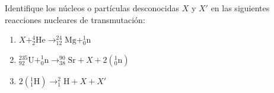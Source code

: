 \item Identifique los núcleos o partículas desconocidas $X$ y $X'$ en las siguientes reacciones nucleares de transmutación:
\begin{enumerate}
    \item $X + ^{4}_{2}\text{He} \to ^{24}_{12}\text{Mg} + ^{1}_{0}\text{n}$
    \item $^{235}_{92}\text{U} + ^{1}_{0}\text{n} \to ^{90}_{38}\text{Sr} + X + 2(^{1}_{0}\text{n})$
    \item $2(^{1}_{1}\text{H}) \to ^{2}_{1}\text{H} + X + X'$
\end{enumerate}